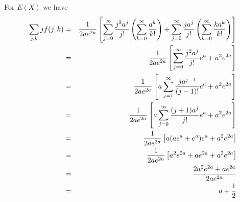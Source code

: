 \bigskip
\noindent
For $E(X)$ we have
\begin{eqnarray*}
\sum_{j,k}jf(j,k)
&=&{1\over2ae^{2a}}\left[
\sum_{j=0}^\infty{j^2a^j\over j!}
\left(\sum_{k=0}^\infty{a^k\over k!}\right)
+
\sum_{j=0}^\infty{ja^j\over j!}
\left(\sum_{k=0}^\infty{ka^k\over k!}\right)
\right]\\
%
&=&{1\over2ae^{2a}}\left[
\sum_{j=0}^\infty{j^2a^j\over j!}e^a
+
a^2e^{2a}
\right]\\
%
&=&{1\over2ae^{2a}}\left[
a\sum_{j=1}^\infty{ja^{j-1}\over(j-1)!}e^a+a^2e^{2a}
\right]\\
%
&=&{1\over2ae^{2a}}\left[
a\sum_{j=0}^\infty{(j+1)a^j\over j!}e^a+a^2e^{2a}
\right]\\
%
&=&{1\over2ae^{2a}}\left[
a(ae^a+e^a)e^a+a^2e^{2a}
\right]\\
%
&=&{1\over2ae^{2a}}\left[
a^2e^{2a}+ae^{2a}+a^2e^{2a}\right]\\
%
&=&{2a^2e^{2a}+ae^{2a}\over2ae^{2a}}\\
&=&a+{1\over2}
\end{eqnarray*}
